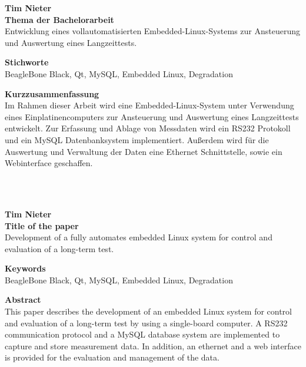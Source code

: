 
\thispagestyle{empty}


{\large \textbf{Tim Nieter}}\\

{\large \textbf{Thema der Bachelorarbeit}}\\
Entwicklung eines vollautomatisierten Embedded-Linux-Systems zur Ansteuerung und Auswertung eines Langzeittests.\

{\large \textbf{Stichworte}}\\
BeagleBone Black, Qt, MySQL, Embedded Linux, Degradation\ 

{\large \textbf{Kurzzusammenfassung}}\\
Im Rahmen dieser Arbeit wird eine Embedded-Linux-System unter Verwendung eines Einplatinencomputers zur Ansteuerung und Auswertung eines Langzeittests entwickelt. Zur Erfassung und Ablage von Messdaten wird ein RS232 Protokoll und ein MySQL Datenbanksystem implementiert. Außerdem wird für die Auswertung und Verwaltung der Daten eine Ethernet Schnittstelle, sowie ein Webinterface geschaffen.\\
\ 


\ 



{\large \textbf{Tim Nieter}}\\

{\large \textbf{Title of the paper}}\\
Development of a fully automates embedded Linux system for control and evaluation of a long-term test.\ 

{\large \textbf{Keywords}}\\
BeagleBone Black, Qt, MySQL, Embedded Linux, Degradation\ 

{\large \textbf{Abstract}}\\
This paper describes the development of an embedded Linux system for control and evaluation of a long-term test by using a single-board computer. A RS232 communication protocol and a MySQL database system are implemented to capture and store measurement data. In addition, an ethernet and a web interface is provided for the evaluation and management of the data.